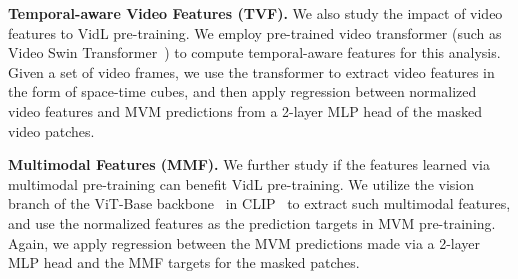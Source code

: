 \documentclass[10pt,twocolumn,letterpaper]{article}
\begin{document}
\vspace{0.5ex}
\noindent \textbf{Temporal-aware Video Features (TVF).} We also study the impact of video features to VidL pre-training. We employ pre-trained video transformer (such as Video Swin Transformer~\cite{liu2022video-swin}) to compute temporal-aware features for this analysis.  
Given a set of video frames, we use the transformer to extract video features in the form of space-time cubes, and then apply  regression between normalized video features and MVM predictions from a 2-layer MLP head of the masked video patches.

\vspace{0.5ex}
\noindent \textbf{Multimodal Features (MMF).} We further study if the features learned via multimodal pre-training can benefit VidL pre-training. We utilize the vision branch of the ViT-Base backbone~\cite{dosovitskiy2021vit} in CLIP~\cite{radford2021clip} to extract such multimodal features, and use the normalized features as the prediction targets in MVM pre-training. Again, we apply  regression between the MVM predictions made via a 2-layer MLP head and the MMF targets for the masked patches.
\end{document}

